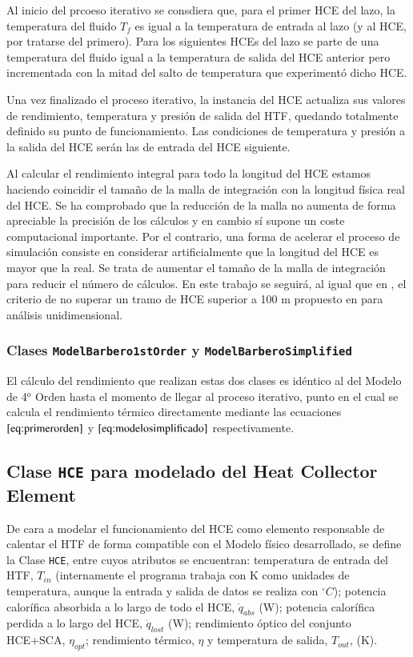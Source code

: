 Al inicio del prcoeso iterativo se consdiera que, para el primer HCE del lazo, la temperatura del fluido \(T_f\) es igual a la temperatura de entrada al lazo (y al HCE, por tratarse del primero). Para los siguientes HCEs del lazo se parte de una temperatura del fluido igual a la temperatura de salida del HCE anterior pero incrementada con la mitad del salto de temperatura que experimentó dicho HCE.

Una vez finalizado el proceso iterativo, la instancia del HCE actualiza sus valores de rendimiento, temperatura y presión de salida del HTF, quedando totalmente definido su punto de funcionamiento. Las condiciones de temperatura y presión a la salida del HCE serán las de entrada del HCE siguiente.

Al calcular el rendimiento integral para todo la longitud del HCE estamos haciendo coincidir el tamaño de la malla de integración con la longitud física real del HCE. Se ha comprobado que la reducción de la malla no aumenta de forma apreciable la precisión de los cálculos y en cambio sí supone un coste computacional importante. Por el contrario, una forma de acelerar el proceso de simulación consiste en considerar artificialmente que la longitud del HCE es mayor que la real. Se trata de aumentar el tamaño de la malla de integración para reducir el número de cálculos. En este trabajo se seguirá, al igual que en \cite{barberofresnoDesarrolloModeloTeorico2018}, el criterio de no superar un tramo de HCE superior a 100 m propuesto en \cite{forristallHeatTransferAnalysis2003} para análisis unidimensional. 

\subsubsection{Clases \texttt{ModelBarbero1stOrder}  y \texttt{ModelBarberoSimplified}}

El cálculo del rendimiento que realizan estas dos clases es idéntico al del Modelo de 4$^o$  Orden hasta el momento de llegar al proceso iterativo, punto en el cual se calcula el rendimiento térmico directamente mediante las ecuaciones  \(\eqref{eq:primerorden}\) y \(\eqref{eq:modelosimplificado}\) respectivamente.


\subsection{Clase \texttt{HCE} para modelado del Heat Collector Element}
\label{heat-collector-element-hce}

De cara a modelar el funcionamiento del HCE como elemento responsable de calentar el HTF de forma compatible con el Modelo físico desarrollado, se define la Clase \texttt{HCE}, entre cuyos atributos se encuentran: temperatura de entrada del HTF, $T_{in}$ (internamente el programa trabaja con K como unidades de temperatura, aunque la entrada y salida de datos se realiza con $^\circ C$); potencia calorífica absorbida a lo largo de todo el HCE, $\dot q_{abs}$ (W); potencia calorífica perdida a lo largo del HCE, $\dot q_{lost}$ (W); rendimiento óptico del conjunto HCE+SCA, $\eta_{opt}$; rendimiento térmico, $\eta$ y temperatura de salida, $T_{out}$, (K). 

